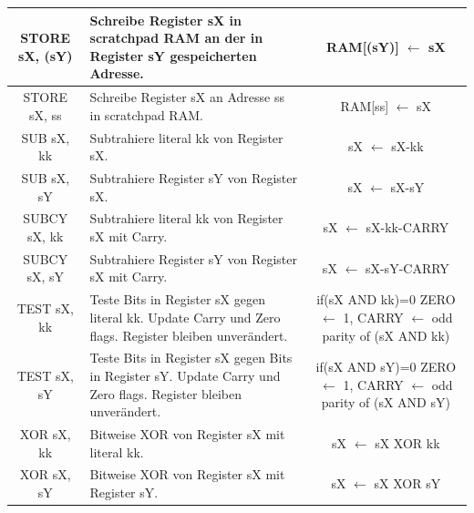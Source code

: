 \documentclass{scrartcl}
\begin{document}
\begin{longtable}{||c|p{4cm}|c||}
         STORE sX, (sY) & Schreibe Register sX in scratchpad RAM an der in Register sY gespeicherten Adresse. &RAM[(sY)] $\leftarrow$ sX \\ \hline
         STORE sX, ss & Schreibe Register sX an Adresse ss in scratchpad RAM. &RAM[ss] $\leftarrow$ sX \\ \hline
         SUB sX, kk & Subtrahiere literal kk von Register sX. &sX $\leftarrow$ sX-kk  \\ \hline
         SUB sX, sY & Subtrahiere Register sY von Register sX. &sX $\leftarrow$ sX-sY  \\ \hline
         SUBCY sX, kk & Subtrahiere literal kk von Register sX mit Carry. &sX $\leftarrow$ sX-kk-CARRY  \\ \hline
         SUBCY sX, sY & Subtrahiere Register sY von Register sX mit Carry. &sX $\leftarrow$ sX-sY-CARRY  \\ \hline
         TEST sX, kk & Teste Bits in Register sX gegen literal kk. Update Carry und Zero flags. Register bleiben unverändert. & \makecell{if(sX AND kk)=0 ZERO $\leftarrow$ 1, \\ CARRY $\leftarrow$ odd parity of (sX AND kk) }   \\ \hline
         TEST sX, sY  & Teste Bits in Register sX gegen Bits in Register sY. Update Carry und Zero flags. Register bleiben unverändert. & \makecell{if(sX AND sY)=0 ZERO $\leftarrow$ 1, \\ CARRY $\leftarrow$ odd parity of (sX AND sY) }  \\ \hline
         XOR sX, kk & Bitweise XOR von Register sX mit literal kk. &sX $\leftarrow$ sX XOR kk  \\ \hline
         XOR sX, sY & Bitweise XOR von Register sX mit Register sY. &sX $\leftarrow$ sX XOR sY   \\ \hline
    
    \end{longtable}
\end{document}
